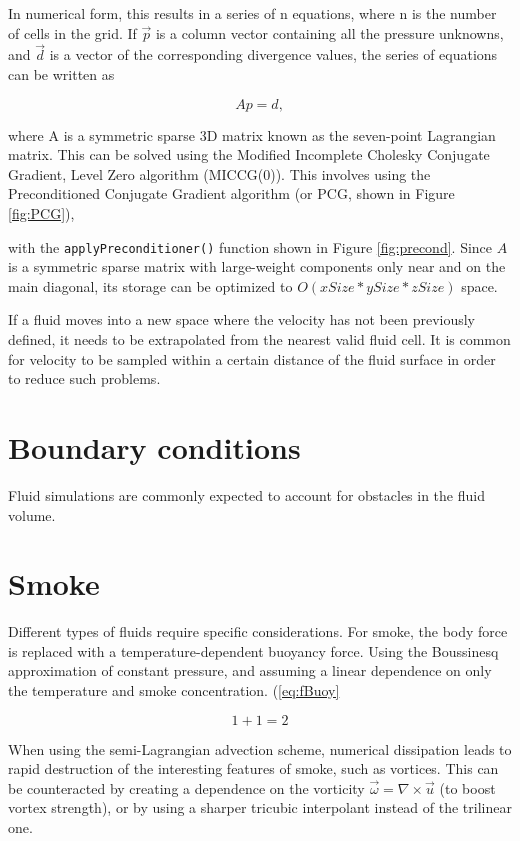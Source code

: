 \documentclass[12pt]{article}
\begin{document}
In numerical form, this results in a series of n equations, where n is the number of cells in the grid. If $\vec{p}$ is a column vector containing all the pressure unknowns, and $\vec{d}$ is a vector of the corresponding divergence values, the series of equations can be written as

\begin{equation}
Ap=d,
\label{eq:apd}
\end{equation}

where A is a symmetric sparse 3D matrix known as the seven-point Lagrangian matrix. This can be solved using the Modified Incomplete Cholesky Conjugate Gradient, Level Zero algorithm (MICCG(0)). This involves using the Preconditioned Conjugate Gradient algorithm (or PCG, shown in Figure \ref{fig:PCG}),

with the \texttt{applyPreconditioner()} function shown in Figure \ref{fig:precond}. Since $A$ is a symmetric sparse matrix with large-weight components only near and on the main diagonal, its storage can be optimized to $O(xSize*ySize*zSize)$ space.

If a fluid moves into a new space where the velocity has not been previously defined, it needs to be extrapolated from the nearest valid fluid cell. It is common for velocity to be sampled within a certain distance of the fluid surface in order to reduce such problems.

\section{Boundary conditions}

Fluid simulations are commonly expected to account for obstacles in the fluid volume. 

\section{Smoke}

Different types of fluids require specific considerations. For smoke, the body force is replaced with a temperature-dependent buoyancy force. Using the Boussinesq approximation of constant pressure, and assuming a linear dependence on only the temperature and smoke concentration.  (\ref{eq:fBuoy}

\begin{equation}
1+1=2
\label{eq:fBuoy}
\end{equation}

When using the semi-Lagrangian advection scheme, numerical dissipation leads to rapid destruction of the interesting features of smoke, such as vortices. This can be counteracted by creating a dependence on the vorticity $\vec{\omega}=\nabla\times\vec{u}$ (to boost vortex strength), or by using a sharper tricubic interpolant instead of the trilinear one.
\end{document}
